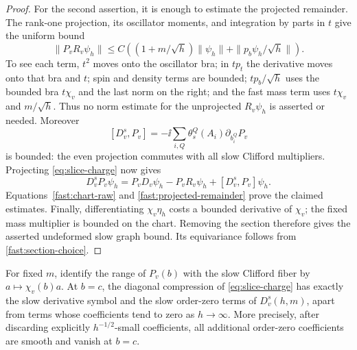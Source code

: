 \begin{proof}
For the second assertion, it is enough to estimate the projected
remainder. The rank-one projection, its oscillator moments, and
integration by parts in $t$ give the uniform bound
\begin{equation}
 \|P_vR_v\psi_h\|
 \leq C\left((1+m/\sqrt h)\|\psi_h\|
                       +\|p_b\psi_h/\sqrt h\|\right).
 \label{fast:projected-remainder}
\end{equation}
To see each term, $t^2$ moves onto the oscillator bra; in $tp_t$ the
derivative moves onto that bra and $t$; spin and density terms are
bounded; $tp_b/\sqrt h$ uses the bounded bra $t\chi_v$ and the last
norm on the right; and the fast mass term uses $t\chi_v$ and
$m/\sqrt h$. Thus no norm estimate for the unprojected $R_v\psi_h$
is asserted or needed. Moreover
\[
 [D_v^s,P_v]=-\ii\sum_{i,Q}\theta_s^Q(A_i)
                                      \partial_{b_i^Q}P_v
\]
is bounded: the even projection commutes with all slow Clifford
multipliers. Projecting \eqref{eq:slice-charge} now gives
\[
 D_v^sP_v\psi_h=P_vD_v\psi_h-P_vR_v\psi_h
                                      +[D_v^s,P_v]\psi_h.
\]
Equations~\eqref{fast:chart-raw} and
\eqref{fast:projected-remainder} prove the claimed estimates. Finally,
differentiating $\chi_v\eta_h$ costs a bounded derivative of $\chi_v$;
the fixed mass multiplier is bounded on the chart. Removing the
section therefore gives the asserted undeformed slow graph bound.
Its equivariance follows from \eqref{fast:section-choice}.
\end{proof}

\begin{lemma}
\label{lem:diagonal-compression}
For fixed $m$, identify the range of $P_v(b)$ with the slow Clifford
fiber by $a\mapsto\chi_v(b)a$. At $b=c$, the diagonal compression of
\eqref{eq:slice-charge} has exactly the slow derivative symbol and
the slow order-zero terms of $D_v^s(h,m)$, apart from terms whose
coefficients tend to zero as $h\to\infty$. More precisely, after
discarding explicitly $h^{-1/2}$-small coefficients, all additional
order-zero coefficients are smooth and vanish at $b=c$.
\end{lemma}

